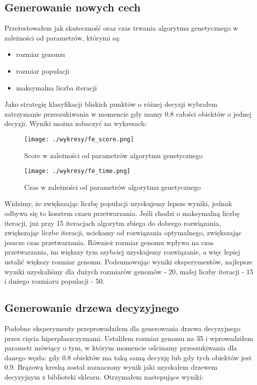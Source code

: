 \documentclass[magisterska]{pracamgr}
\theoremstyle{plain}
\theoremstyle{definition}
\theoremstyle{remark}
\begin{document}
\subsection{Generowanie nowych cech}
Przetestowałem jak skuteczność oraz czas trwania algorytmu genetycznego w zależności od parametrów, którymi są:
  \begin{itemize}
   \item rozmiar genomu
   \item rozmiar populacji
   \item maksymalna liczba iteracji
  \end{itemize}
Jako strategię klasyfikacji bliskich punktów o różnej decyzji wybrałem zatrzymanie przeszukiwania w momencie gdy mamy 
0.8 całości obiektów o jednej decyzji.
Wyniki można zobaczyć na wykresach:
\newpage

\begin{figure}
 \caption{Score w zależności od parametrów algorytmu genetycznego}
 \centering\texttt{[image: ./wykresy/fe\_score.png]}
\end{figure}

\begin{figure}
 \caption{Czas w zależności od parametrów algorytmu genetycznego}
 \centering\texttt{[image: ./wykresy/fe\_time.png]}
\end{figure}

Widzimy, że zwiększając liczbę populacji uzyskujemy lepsze wyniki, jednak odbywa się to kosztem
czasu przetwarzania. Jeśli chodzi o maksymalną liczbę iteracji, już przy 15 iteracjach algorytm zbiega do 
dobrego rozwiązania, zwiększając liczbe iteracji, uciekamy od rozwiązania optymalnego, zwiększając jeszcze 
czas przetwarzania. Również rozmiar genomu wpływa na czas przetwarzania, im większy tym szybciej
uzyskujemy rozwiązanie, a więc lepiej ustalić większy rozmiar genomu. Podsumowując wyniki eksperymentów, najlepsze
wyniki uzyskaliśmy dla dużych rozmiarów genomów - 20, małej liczby iteracji - 15 i dużego rozmiaru populacji - 50.

\subsection{Generowanie drzewa decyzyjnego}
Podobne eksperymenty przeprowadziłem dla generowania drzewa decyzyjnego przez cięcia hiperpłaszczyznami.
Ustaliłem rozmiar genomu na 35 i wprowadziłem parametr mówiący o tym, w którym momencie odcinamy przeszukiwania 
dla danego węzła: gdy 0.8 obiektów ma taką samą decyzję lub gdy tych obiektów jest 0.9.
Brązową kreską został zaznaczony wynik jaki uzyskałem drzewem decyzyjnym z biblioteki sklearn.
Otrzymałem nastepujące wyniki:
\end{document}
